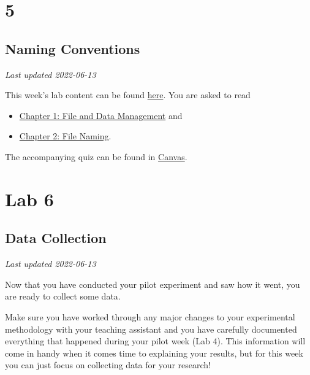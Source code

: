 \documentclass[
]{book}
\providecommand{\tightlist}{%
  \setlength{\itemsep}{0pt}\setlength{\parskip}{0pt}}
\begin{document}
\hypertarget{part-5}{%
\part*{5}\label{part-5}}

\hypertarget{naming-conventions}{%
\chapter*{Naming Conventions}\label{naming-conventions}}

\emph{Last updated 2022-06-13}

This week's lab content can be found \href{https://ubco-biology.github.io/Procedures-and-Guidelines/file-and-data-management.html}{here}. You are asked to read

\begin{itemize}
\tightlist
\item
  \href{https://ubco-biology.github.io/Procedures-and-Guidelines/file-and-data-management.html}{Chapter 1: File and Data Management} and
\item
  \href{https://ubco-biology.github.io/Procedures-and-Guidelines/file-naming.html}{Chapter 2: File Naming}.
\end{itemize}

The accompanying quiz can be found in \href{https://canvas.ubc.ca}{Canvas}.

\hypertarget{part-lab-6}{%
\part*{Lab 6}\label{part-lab-6}}

\hypertarget{data-collection}{%
\chapter*{Data Collection}\label{data-collection}}

\emph{Last updated 2022-06-13}

Now that you have conducted your pilot experiment and saw how it went, you are ready to collect some data.

Make sure you have worked through any major changes to your experimental methodology with your teaching assistant and you have carefully documented everything that happened during your pilot week (Lab 4). This information will come in handy when it comes time to explaining your results, but for this week you can just focus on collecting data for your research!
\end{document}
